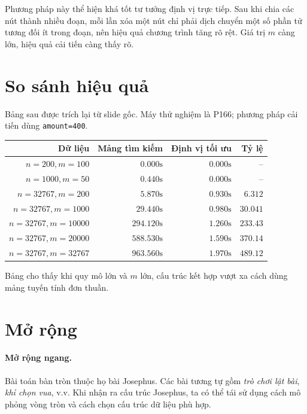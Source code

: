 \documentclass[11pt]{article}
\begin{document}
Phương pháp này thể hiện khá tốt tư tưởng định vị trực tiếp. Sau khi chia các
nút thành nhiều đoạn, mỗi lần xóa một nút chỉ phải dịch chuyển một số phần tử
tương đối ít trong đoạn, nên hiệu quả chương trình tăng rõ rệt. Giá trị \(m\)
càng lớn, hiệu quả cải tiến càng thấy rõ.

\section{So sánh hiệu quả}

Bảng sau được trích lại từ slide gốc. Máy thử nghiệm là P166; phương pháp cải
tiến dùng \texttt{amount=400}.

\begin{center}
\begin{tabular}{rrrr}
\textbf{Dữ liệu} & \textbf{Mảng tìm kiếm} &
\textbf{Định vị tối ưu} & \textbf{Tỷ lệ}\\ \hline
\(n=200,m=100\) & \(0.000\mathrm{s}\) & \(0.000\mathrm{s}\) & --\\
\(n=1000,m=50\) & \(0.440\mathrm{s}\) & \(0.000\mathrm{s}\) & --\\
\(n=32767,m=200\) & \(5.870\mathrm{s}\) & \(0.930\mathrm{s}\) & \(6.312\)\\
\(n=32767,m=1000\) & \(29.440\mathrm{s}\) & \(0.980\mathrm{s}\) & \(30.041\)\\
\(n=32767,m=10000\) & \(294.120\mathrm{s}\) & \(1.260\mathrm{s}\) & \(233.43\)\\
\(n=32767,m=20000\) & \(588.530\mathrm{s}\) & \(1.590\mathrm{s}\) & \(370.14\)\\
\(n=32767,m=32767\) & \(963.560\mathrm{s}\) & \(1.970\mathrm{s}\) & \(489.12\)
\end{tabular}
\end{center}

Bảng cho thấy khi quy mô lớn và \(m\) lớn, cấu trúc kết hợp vượt xa cách dùng
mảng tuyến tính đơn thuần.

\section{Mở rộng}

\paragraph{Mở rộng ngang.}
Bài toán bàn tròn thuộc họ bài Josephus. Các bài tương tự gồm \textit{trò chơi
lật bài}, \textit{khỉ chọn vua}, v.v. Khi nhận ra cấu trúc Josephus, ta có thể
tái sử dụng cách mô phỏng vòng tròn và cách chọn cấu trúc dữ liệu phù hợp.
\end{document}
